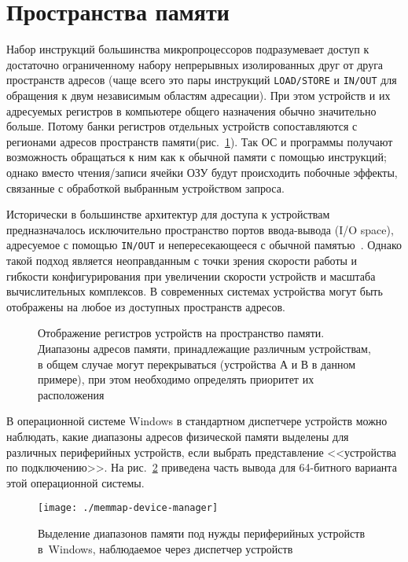 \section{Пространства памяти}

Набор инструкций большинства микропроцессоров подразумевает доступ к достаточно ограниченному набору  непрерывных изолированных друг от друга пространств адресов  (чаще всего это пары инструкций \texttt{LOAD/STORE} и  \texttt{IN/OUT} для обращения к двум независимым областям адресации). При этом устройств и их адресуемых  регистров в компьютере общего назначения обычно значительно больше. Потому банки регистров отдельных устройств сопоставляются с регионами адресов пространств памяти(рис.~\ref{fig:memmap}). Так ОС и программы получают возможность обращаться к ним как к обычной памяти с помощью инструкций; однако вместо чтения/записи ячейки ОЗУ будут происходить побочные эффекты, связанные с обработкой выбранным устройством запроса.

Исторически в большинстве архитектур для доступа к устройствам предназначалось исключительно пространство портов ввода-вывода (\abbr I/O space), адресуемое с помощью \texttt{IN/OUT} и непересекающееся с обычной памятью~\citep{cs473-io}. Однако такой подход является неоправданным с точки зрения скорости работы и гибкости конфигурирования при увеличении скорости устройств и масштаба вычислительных комплексов. В современных системах устройства могут быть отображены на любое из доступных пространств адресов.

\begin{figure}[htb]
    \centering
    \caption[Отображение регистров на пространство памяти]{Отображение регистров устройств на пространство памяти. Диапазоны адресов памяти, принадлежащие различным устройствам, в общем случае могут перекрываться (устройства А и В в данном примере), при этом необходимо определять приоритет их расположения}
    \label{fig:memmap}
\end{figure}

В операционной системе Windows в стандартном диспетчере устройств можно наблюдать, какие диапазоны адресов физической памяти выделены для различных периферийных устройств, если выбрать представление <<устройства по подключению>>. На рис.~\ref{fig:memmap-device-manager} приведена часть вывода для 64-битного варианта этой операционной системы.

\begin{figure}[htb]
    \centering
    \texttt{[image: ./memmap-device-manager]}
    \caption[Выделение диапазонов памяти в~Windows]{Выделение диапазонов памяти под нужды периферийных устройств в~Windows, наблюдаемое через диспетчер устройств}
    \label{fig:memmap-device-manager}
\end{figure}


